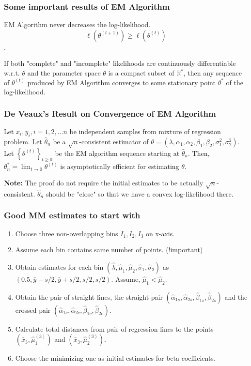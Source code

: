 \documentclass{beamer}
\begin{document}
\begin{frame}
	\frametitle{Some important results of EM Algorithm}
	\begin{theorem}
		EM Algorithm never decreases the log-likelihood.
		$$\ell(\theta^{(t+1)}) \geq \ell(\theta^{(t)})$$.
	\end{theorem}
	
	\begin{theorem}[Wu, 1983]
		If both "complete" and "incomplete" likelihoods are continuously differentiable w.r.t. $\theta$ and the parameter space $\theta$ is a compact subset of $\mathbb{R}^*$, then any sequence of $\theta^{(t)}$  produced by EM Algorithm converges to some stationary point $\theta^*$ of the log-likelihood.
	\end{theorem}
\end{frame}

\begin{frame}
	\frametitle{De Veaux's Result on Convergence of EM Algorithm}
	\begin{theorem}[De Veaux, 1986]
		Let $x_i, y_i, i=1,2,\dots n$ be independent samples from mixture of regression problem. Let $\hat{\theta}_n$ be a $\sqrt{n}$-consistent estimator of $\theta = (\lambda, \alpha_1, \alpha_2,\beta_1,\beta_2,\sigma_1^2, \sigma_2^2)$. Let $\left\{ \theta^{(t)} \right\}_{t\geq 0}$ be the EM algorithm sequence starting at $\hat{\theta}_n$. Then, $\theta_n^* = \lim_{t\rightarrow 0}\theta^{(t)}$ is asymptotically efficient for estimating $\theta$.
	\end{theorem}

	\textbf{Note:} The proof do not require the initial estimates to be actually $\sqrt{n}$-consistent. $\hat{\theta}_n$ should be "close" so that we have a convex log-likelihood there.
\end{frame}

\begin{frame}
	\frametitle{Good MM estimates to start with}
	\begin{enumerate}
		\item Choose three non-overlapping bins $I_1, I_2, I_3$ on x-axis.
		\item Assume each bin contains same number of points. (!important)
		\item Obtain estimates for each bin $(\hat{\lambda}, \hat{\mu}_1, \hat{\mu}_2, \hat{\sigma}_1, \hat{\sigma}_2)$ as $(0.5, \bar{y}- s/2, \bar{y} + s/2, s/2, s/2)$. Assume, $\hat{\mu}_1 < \hat{\mu}_2$.
		\item Obtain the pair of straight lines, the straight pair $(\hat{\alpha}_{1s}, \hat{\alpha}_{2s}, \hat{\beta}_{1s}, \hat{\beta}_{2s})$ and the crossed pair $(\hat{\alpha}_{1c}, \hat{\alpha}_{2c}, \hat{\beta}_{1c}, \hat{\beta}_{2c})$.
		\item Calculate total distances from pair of regression lines to the points $(\bar{x}_3, \hat{\mu}_1^{(3)})$ and $(\bar{x}_3, \hat{\mu}_2^{(3)})$.
		\item Choose the minimizing one as initial estimates for beta coefficients.
	\end{enumerate}
\end{frame}
\end{document}
